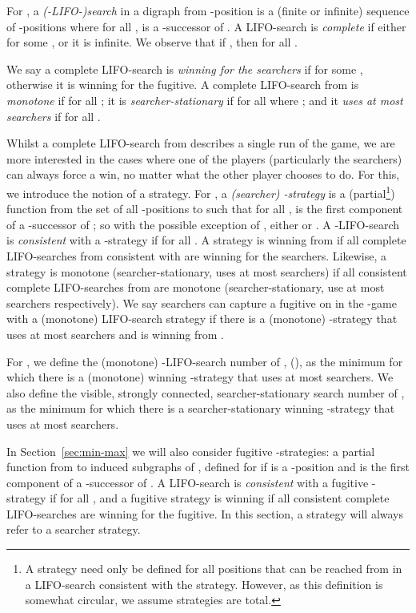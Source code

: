 \documentclass{llncs}
\begin{document}
For , a \emph{(-LIFO-)search} in a digraph  from -position  is a (finite or infinite) sequence of -positions   where for all ,  is a -successor of .   A LIFO-search is \emph{complete} if 
either  for some , or it is infinite.  We observe that if , then  for all . 

We say a complete LIFO-search is \emph{winning for the searchers} if  for some , otherwise it is winning for the fugitive.   A complete LIFO-search from  is \emph{monotone} if  for all ; it is \emph{searcher-stationary} if  for all  where ; and it \emph{uses at most  searchers} if  for all .  

Whilst a complete LIFO-search from  describes a single run of the game, we are more interested in the cases where one of the players (particularly the searchers) can always force a win, no matter what the other player chooses to do.  For this, we introduce the notion of a strategy.  For , a \emph{(searcher) -strategy} is a (partial\footnote{A strategy need only be defined for all positions  that can be reached from  in a LIFO-search consistent with the strategy.  However, as this definition is somewhat circular, we assume strategies are total.}) function  from the set of all -positions to  such that for all ,  is the first component of a -successor of ; so with the possible exception of , either  or .  A -LIFO-search  is \emph{consistent} with a -strategy  if  for all .  A strategy  is winning from  if all complete LIFO-searches from  consistent with  are winning for the searchers.  Likewise, a strategy is monotone (searcher-stationary, uses at most  searchers) if all consistent complete LIFO-searches from  are monotone (searcher-stationary, use at most  searchers respectively).  We say  searchers can capture a fugitive on  in the -game with a (monotone) LIFO-search strategy if there is a (monotone) -strategy that uses at most  searchers and is winning from . 

For , we define the (monotone) -LIFO-search number of ,  (), as the minimum  for which there is a (monotone) winning -strategy that uses at most  searchers.  We also define the visible, strongly connected, searcher-stationary search number of ,  as the minimum  for which there is a searcher-stationary winning -strategy that uses at most  searchers.  

In Section~\ref{sec:min-max} we will also consider fugitive -strategies: a partial function  from  to induced subgraphs of , defined for  if  is a -position and  is the first component of a -successor of .  A LIFO-search  is \emph{consistent} with a fugitive -strategy  if  for all , and a fugitive strategy is winning if all consistent complete LIFO-searches are winning for the fugitive.   In this section, a strategy will always refer to a searcher strategy.
\end{document}
